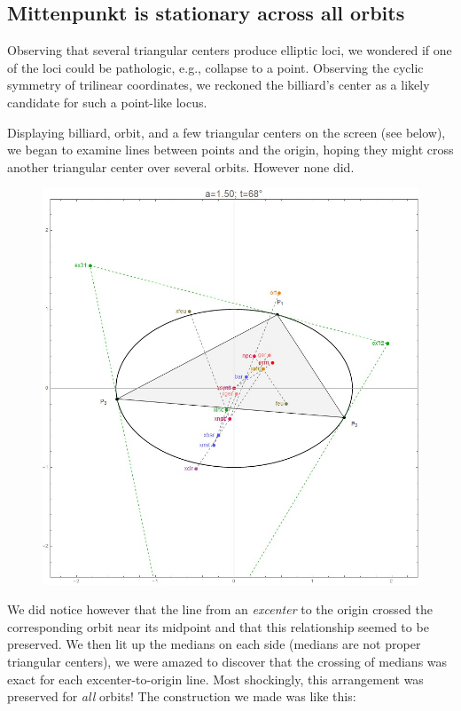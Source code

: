 \documentclass[]{article}
\begin{document}
\hypertarget{mittenpunkt-is-stationary-across-all-orbits}{%
\subsection{Mittenpunkt is stationary across all orbits}\label{mittenpunkt-is-stationary-across-all-orbits}}

Observing that several triangular centers produce elliptic loci, we wondered if one of the loci could be pathologic, e.g., collapse to a point. Observing the cyclic symmetry of trilinear coordinates, we reckoned the billiard's center as a likely candidate for such a point-like locus.

Displaying billiard, orbit, and a few triangular centers on the screen (see below), we began to examine lines between points and the origin, hoping they might cross another triangular center over several orbits. However none did.

\begin{figure}[H]

{\centering \includegraphics[width=0.5\linewidth]{pics/several_tri_points} 

}

\end{figure}

We did notice however that the line from an \emph{excenter} to the origin crossed the corresponding orbit near its midpoint and that this relationship seemed to be preserved. We then lit up the medians on each side (medians are not proper triangular centers), we were amazed to discover that the crossing of medians was exact for each excenter-to-origin line. Most shockingly, this arrangement was preserved for \emph{all} orbits! The construction we made was like this:
\end{document}
